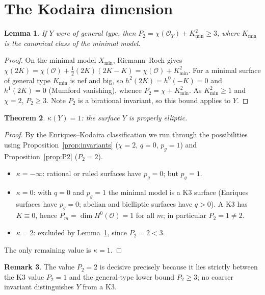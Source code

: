 \documentclass[11pt]{article}
\newtheorem{theorem}{Theorem}[section]
\newtheorem{lemma}[theorem]{Lemma}
\theoremstyle{definition}
\newtheorem{remark}[theorem]{Remark}
\newcommand{\cO}{\mathcal{O}}
\begin{document}
\section{The Kodaira dimension}

\begin{lemma}\label{lem:gt}
If $Y$ were of general type, then $P_2=\chi(\cO_Y)+K^2_{\min}\ge3$, where
$K_{\min}$ is the canonical class of the minimal model.
\end{lemma}

\begin{proof}
On the minimal model $X_{\min}$, Riemann--Roch gives
$\chi(2K)=\chi(\cO)+\tfrac12(2K)(2K-K)=\chi(\cO)+K^2_{\min}$. For a minimal
surface of general type $K_{\min}$ is nef and big, so $h^2(2K)=h^0(-K)=0$ and
$h^1(2K)=0$ (Mumford vanishing), whence $P_2=\chi+K^2_{\min}$. As
$K^2_{\min}\ge1$ and $\chi=2$, $P_2\ge3$. Note $P_2$ is a birational
invariant, so this bound applies to $Y$.
\end{proof}

\begin{theorem}\label{thm:main}
$\kappa(Y)=1$: the surface $Y$ is properly elliptic.
\end{theorem}

\begin{proof}
By the Enriques--Kodaira classification we run through the possibilities using
Proposition~\ref{prop:invariants} ($\chi=2$, $q=0$, $p_g=1$) and
Proposition~\ref{prop:P2} ($P_2=2$).
\begin{itemize}
\item $\kappa=-\infty$: rational or ruled surfaces have $p_g=0$; but $p_g=1$.
\item $\kappa=0$: with $q=0$ and $p_g=1$ the minimal model is a K3 surface
  (Enriques surfaces have $p_g=0$; abelian and bielliptic surfaces have
  $q>0$). A K3 has $K\equiv0$, hence $P_m=\dim H^0(\cO)=1$ for all $m$; in
  particular $P_2=1\ne2$.
\item $\kappa=2$: excluded by Lemma~\ref{lem:gt}, since $P_2=2<3$.
\end{itemize}
The only remaining value is $\kappa=1$.
\end{proof}

\begin{remark}
The value $P_2=2$ is decisive precisely because it lies strictly between the
K3 value $P_2=1$ and the general-type lower bound $P_2\ge3$; no coarser
invariant distinguishes $Y$ from a K3.
\end{remark}
\end{document}
